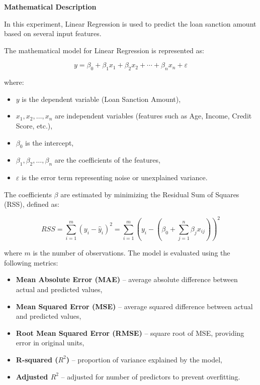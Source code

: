\documentclass[11pt]{article}
\begin{document}
\vspace{0.5cm}
\noindent
\textbf{Mathematical Description}

\vspace{0.5cm}
\noindent
In this experiment, Linear Regression is used to predict the loan sanction amount based on several input features.

\noindent
The mathematical model for Linear Regression is represented as:

\[
y = \beta_0 + \beta_1 x_1 + \beta_2 x_2 + \cdots + \beta_n x_n + \varepsilon
\]

\noindent
where:
\begin{itemize}
    \item $y$ is the dependent variable (Loan Sanction Amount),
    \item $x_1, x_2, \ldots, x_n$ are independent variables (features such as Age, Income, Credit Score, etc.),
    \item $\beta_0$ is the intercept,
    \item $\beta_1, \beta_2, \ldots, \beta_n$ are the coefficients of the features,
    \item $\varepsilon$ is the error term representing noise or unexplained variance.
\end{itemize}

\noindent
The coefficients $\beta$ are estimated by minimizing the Residual Sum of Squares (RSS), defined as:

\[
RSS = \sum_{i=1}^{m} \left( y_i - \hat{y}_i \right)^2 = \sum_{i=1}^{m} \left( y_i - \left( \beta_0 + \sum_{j=1}^{n} \beta_j x_{ij} \right) \right)^2
\]

\noindent
where $m$ is the number of observations. The model is evaluated using the following metrics:

\begin{itemize}
    \item \textbf{Mean Absolute Error (MAE)} – average absolute difference between actual and predicted values,
    \item \textbf{Mean Squared Error (MSE)} – average squared difference between actual and predicted values,
    \item \textbf{Root Mean Squared Error (RMSE)} – square root of MSE, providing error in original units,
    \item \textbf{R-squared ($R^2$)} – proportion of variance explained by the model,
    \item \textbf{Adjusted $R^2$} – adjusted for number of predictors to prevent overfitting.
\end{itemize}
\end{document}
